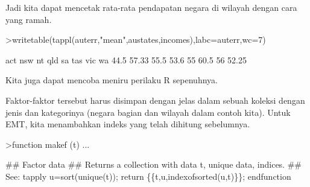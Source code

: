 \documentclass[a4paper,10pt]{article}
\begin{document}
\begin{eulernotebook}
\begin{eulercomment}
\begin{eulercomment}
\begin{eulercomment}
\begin{eulercomment}
\begin{eulercomment}
\begin{eulercomment}
\begin{eulercomment}
\begin{eulercomment}
\begin{eulercomment}
\begin{eulercomment}
\begin{eulercomment}
\begin{eulercomment}
\begin{eulercomment}
\begin{eulercomment}
\begin{eulercomment}
\begin{eulercomment}
\begin{eulercomment}
\begin{eulercomment}
\begin{eulercomment}
\begin{eulercomment}
\begin{eulercomment}
\begin{eulercomment}
\begin{eulercomment}
\begin{eulercomment}
\begin{eulercomment}
\begin{eulercomment}
\begin{eulercomment}
\begin{eulercomment}
\begin{eulercomment}
\begin{eulercomment}
\begin{eulercomment}
\begin{eulercomment}
\begin{eulercomment}
\begin{eulercomment}
\begin{eulercomment}
\begin{eulercomment}
\begin{eulercomment}
\begin{eulercomment}
\begin{eulercomment}
\begin{eulercomment}
\begin{eulercomment}
\begin{eulercomment}
\begin{eulercomment}
\begin{eulercomment}
\begin{eulercomment}
\begin{eulercomment}
\begin{eulercomment}
\begin{eulercomment}
\begin{eulercomment}
Jadi kita dapat mencetak rata-rata pendapatan negara di wilayah dengan
cara yang ramah.
\end{eulercomment}
\begin{eulerprompt}
>writetable(tappl(auterr,"mean",austates,incomes),labc=auterr,wc=7)
\end{eulerprompt}
\begin{euleroutput}
      act    nsw     nt    qld     sa    tas    vic     wa
     44.5  57.33   55.5   53.6     55   60.5     56  52.25
\end{euleroutput}
\begin{eulercomment}
Kita juga dapat mencoba meniru perilaku R sepenuhnya.

Faktor-faktor tersebut harus disimpan dengan jelas dalam sebuah
koleksi dengan jenis dan kategorinya (negara bagian dan wilayah dalam
contoh kita). Untuk EMT, kita menambahkan indeks yang telah dihitung
sebelumnya.
\end{eulercomment}
\begin{eulerprompt}
>function makef (t) ...
\end{eulerprompt}
\begin{eulerudf}
  ## Factor data
  ## Returns a collection with data t, unique data, indices.
  ## See: tapply
  u=sort(unique(t));
  return \{\{t,u,indexofsorted(u,t)\}\};
  endfunction

\end{eulerudf}
\end{eulercomment}
\end{eulercomment}
\end{eulercomment}
\end{eulercomment}
\end{eulercomment}
\end{eulercomment}
\end{eulercomment}
\end{eulercomment}
\end{eulercomment}
\end{eulercomment}
\end{eulercomment}
\end{eulercomment}
\end{eulercomment}
\end{eulercomment}
\end{eulercomment}
\end{eulercomment}
\end{eulercomment}
\end{eulercomment}
\end{eulercomment}
\end{eulercomment}
\end{eulercomment}
\end{eulercomment}
\end{eulercomment}
\end{eulercomment}
\end{eulercomment}
\end{eulercomment}
\end{eulercomment}
\end{eulercomment}
\end{eulercomment}
\end{eulercomment}
\end{eulercomment}
\end{eulercomment}
\end{eulercomment}
\end{eulercomment}
\end{eulercomment}
\end{eulercomment}
\end{eulercomment}
\end{eulercomment}
\end{eulercomment}
\end{eulercomment}
\end{eulercomment}
\end{eulercomment}
\end{eulercomment}
\end{eulercomment}
\end{eulercomment}
\end{eulercomment}
\end{eulercomment}
\end{eulercomment}
\end{eulernotebook}
\end{document}
